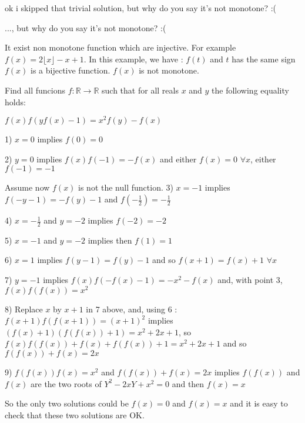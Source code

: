 \begin{mysolution}
ok i skipped that trivial solution, but why do you say it's not monotone? :(
\end{mysolution}



\begin{mysolution}
	\begin{tcolorbox} ..., but why do you say it's not monotone? :(\end{tcolorbox}

It exist non monotone function which are injective. For example $ f(x)=2\lfloor x\rfloor-x+1$. In this example, we have :
$ f(t)$ and $ t$ has the same sign
$ f(x)$ is a bijective function.
$ f(x)$ is not monotone.
\end{mysolution}



\begin{mysolution}
	\begin{tcolorbox}Find all funcions $ f: \mathbb{R}\to\mathbb{R}$ such that for all reals $ x$ and $ y$ the following equality holds:

$ f(x)f(yf(x)-1)=x^{2}f(y)-f(x)$\end{tcolorbox}

1) $ x=0$ implies $ f(0)=0$

2) $ y=0$ implies $ f(x)f(-1)=-f(x)$ and either $ f(x)=0$ $ \forall x$, either $ f(-1)=-1$

Assume now $ f(x)$ is not the null function.
3) $ x=-1$ implies $ f(-y-1)=-f(y)-1$ and $ f(-\frac{1}{2})=-\frac{1}{2}$

4) $ x=-\frac{1}{2}$ and $ y=-2$ implies $ f(-2)=-2$

5) $ x=-1$ and $ y=-2$ implies then $ f(1)=1$

6) $ x=1$ implies $ f(y-1)=f(y)-1$ and so $ f(x+1)=f(x)+1$ $ \forall x$

7) $ y=-1$ implies $ f(x)f(-f(x)-1)=-x^{2}-f(x)$ and, with point 3, $ f(x)f(f(x))=x^{2}$

8) Replace $ x$ by $ x+1$ in 7 above, and, using 6 : $ f(x+1)f(f(x+1))=(x+1)^{2}$ implies $ (f(x)+1)(f(f(x))+1)=x^{2}+2x+1$, so $ f(x)f(f(x))+f(x)+f(f(x))+1=x^{2}+2x+1$ and so $ f(f(x))+f(x)=2x$

9) $ f(f(x))f(x)=x^{2}$ and $ f(f(x))+f(x)=2x$ implies $ f(f(x))$ and $ f(x)$ are the two roots of $ Y^{2}-2xY+x^{2}=0$ and then $ f(x)=x$

So the only two solutions could be $ f(x)=0$ and $ f(x)=x$ and it is easy to check that these two solutions are OK.
\end{mysolution}



